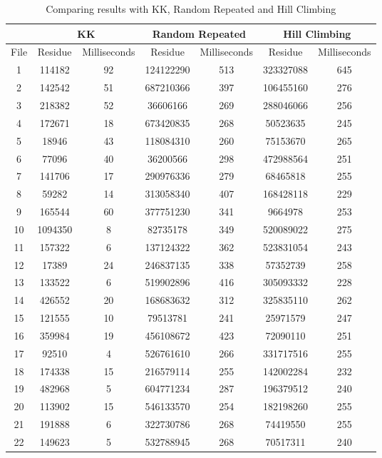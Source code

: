 \documentclass[tikz, 12pt]{scrartcl}
\begin{document}
\begin{longtable}{|c|cc|cc|cc|}
\caption{Comparing results with KK,  Random Repeated and Hill Climbing}\\
\hline
 	 & \multicolumn{2}{c}{ KK} 	 & \multicolumn{2}{c}{ Random Repeated} 	 & \multicolumn{2}{c|}{ Hill Climbing} \\
\hline
File	 & Residue 	 & 	 Milliseconds	 & Residue 	 & 	 Milliseconds	 & Residue 	 & 	 Milliseconds\\
\hline
1	 &114182	 & 	92	 &124122290	 & 	513	 &323327088	 & 	645\\
2	 &142542	 & 	51	 &687210366	 & 	397	 &106455160	 & 	276\\
3	 &218382	 & 	52	 &36606166	 & 	269	 &288046066	 & 	256\\
4	 &172671	 & 	18	 &673420835	 & 	268	 &50523635	 & 	245\\
5	 &18946	 & 	43	 &118084310	 & 	260	 &75153670	 & 	265\\
6	 &77096	 & 	40	 &36200566	 & 	298	 &472988564	 & 	251\\
7	 &141706	 & 	17	 &290976336	 & 	279	 &68465818	 & 	255\\
8	 &59282	 & 	14	 &313058340	 & 	407	 &168428118	 & 	229\\
9	 &165544	 & 	60	 &377751230	 & 	341	 &9664978	 & 	253\\
10	 &1094350	 & 	8	 &82735178	 & 	349	 &520089022	 & 	275\\
11	 &157322	 & 	6	 &137124322	 & 	362	 &523831054	 & 	243\\
12	 &17389	 & 	24	 &246837135	 & 	338	 &57352739	 & 	258\\
13	 &133522	 & 	6	 &519902896	 & 	416	 &305093332	 & 	228\\
14	 &426552	 & 	20	 &168683632	 & 	312	 &325835110	 & 	262\\
15	 &121555	 & 	10	 &79513781	 & 	241	 &25971579	 & 	247\\
16	 &359984	 & 	19	 &456108672	 & 	423	 &72090110	 & 	251\\
17	 &92510	 & 	4	 &526761610	 & 	266	 &331717516	 & 	255\\
18	 &174338	 & 	15	 &216579114	 & 	255	 &142002284	 & 	232\\
19	 &482968	 & 	5	 &604771234	 & 	287	 &196379512	 & 	240\\
20	 &113902	 & 	15	 &546133570	 & 	254	 &182198260	 & 	255\\
21	 &191888	 & 	6	 &322730786	 & 	268	 &74419550	 & 	255\\
22	 &149623	 & 	5	 &532788945	 & 	268	 &70517311	 & 	240\\

\end{longtable}
\end{document}
